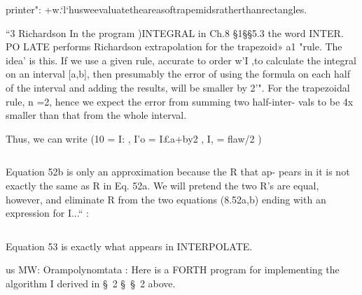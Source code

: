 printer": +w.‘l‘husweevaluatetheareasoftrapemidsratherthanrectangles.

“3 Richardson
In the program )INTEGRAL in Ch.8 §1§§5.3 the word INTER.
PO LATE performs Richardson extrapolation for the trapezoid»
a1 "rule. The idea' is this. If we use a given rule, accurate to order
w’I ,to calculate the integral on an interval [a,b], then presumably
the error of using the formula on each half of the interval and
adding the results, will be smaller by 2'". For the trapezoidal rule,
n =2, hence we expect the error from summing two half-inter-
vals to be 4x smaller than that from the whole interval.

Thus, we can write (10 = I: , I'o = I£a+by2 , I, = ﬂaw/2 )

\begin{equation}
\end{equation}

Equation 52b is only an approximation because the R that ap-
pears in it is not exactly the same as R in Eq. 52a. We will pretend
the two R’s are equal, however, and eliminate R from the two
equations (8.52a,b) ending with an expression for I...“ :

\begin{equation}
\end{equation}

Equation 53 is exactly what appears in INTERPOLATE.


us MW: Orampolynomtata
: Here is a FORTH program for implementing the algorithm
I derived in \S\ 2 \S\ \S\ 2 above.

